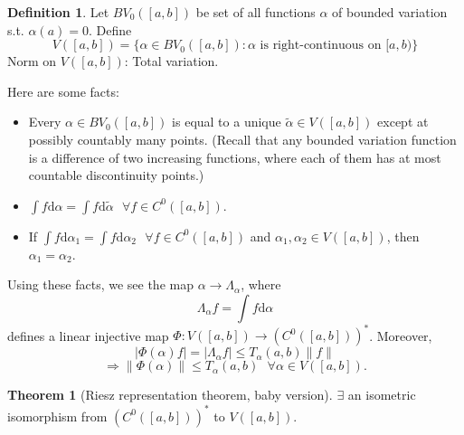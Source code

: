 \documentclass{article}
\newcommand{\sfa}{\text{  } \forall}
\theoremstyle{definition}
\newtheorem{thm}{Theorem}
\newtheorem{dfn}{Definition}
\begin{document}
\begin{dfn}
	Let $BV_0([a, b])$ be set of all functions $\alpha$ of bounded variation s.t. $\alpha(a) = 0$.
	Define 
	\[
		V([a, b]) = \{\alpha \in BV_0([a, b]): \alpha \text{ is right-continuous on }[a, b) \}
	\]
	Norm on $V([a, b])$: Total variation.

\end{dfn}

Here are some facts:
\begin{itemize}
	\item Every $\alpha \in BV_0([a, b])$ is equal to a unique $\tilde{\alpha} \in V([a, b])$ except at possibly countably many points.
		(Recall that any bounded variation function is a difference of two increasing functions, where each of them has at most countable discontinuity points.)

	\item $\int f \mathrm{d} \alpha = \int f \mathrm{d} \tilde{\alpha} \sfa f \in C^0([a, b])$.

	\item If $\int f \mathrm{d} \alpha_1 = \int f \mathrm{d} \alpha_2 \sfa f \in C^0([a, b])$ and $\alpha_1, \alpha_2 \in V([a, b])$, then $\alpha_1 = \alpha_2$.
\end{itemize}

Using these facts, we see the map $\alpha \to \Lambda_\alpha$, where
\[
	\Lambda_\alpha f = \int f \mathrm{d} \alpha
\]
defines a linear injective map $\Phi:V([a, b]) \to (C^0([a, b]))^*$.
Moreover, 
\[
	|\Phi(\alpha) f| = |\Lambda_\alpha f| \leq T_\alpha(a, b) \|f\|
\]
\[
	\Rightarrow \|\Phi(\alpha)\| \leq T_\alpha(a, b) \sfa \alpha \in V([a, b]).
\]
\begin{thm}[Riesz representation theorem, baby version]
	$\exists$ an isometric isomorphism from $(C^0([a, b]))^*$ to $V([a, b])$.
\end{thm}
\end{document}
